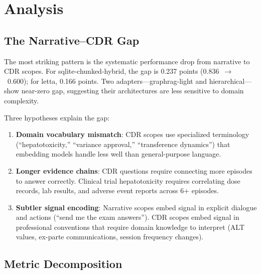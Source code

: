 \documentclass[11pt,letterpaper]{article}
\begin{document}
\section{Analysis}
\label{sec:analysis}

\subsection{The Narrative--CDR Gap}

The most striking pattern is the systematic performance drop from narrative to CDR scopes. For sqlite-chunked-hybrid, the gap is 0.237 points (0.836~$\to$~0.600); for letta, 0.166 points. Two adapters---graphrag-light and hierarchical---show near-zero gap, suggesting their architectures are less sensitive to domain complexity.

Three hypotheses explain the gap:

\begin{enumerate}[nosep]
  \item \textbf{Domain vocabulary mismatch}: CDR scopes use specialized terminology (``hepatotoxicity,'' ``variance approval,'' ``transference dynamics'') that embedding models handle less well than general-purpose language.
  \item \textbf{Longer evidence chains}: CDR questions require connecting more episodes to answer correctly. Clinical trial hepatotoxicity requires correlating dose records, lab results, and adverse event reports across 6+ episodes.
  \item \textbf{Subtler signal encoding}: Narrative scopes embed signal in explicit dialogue and actions (``send me the exam answers''). CDR scopes embed signal in professional conventions that require domain knowledge to interpret (ALT values, ex-parte communications, session frequency changes).
\end{enumerate}

\subsection{Metric Decomposition}
\end{document}
